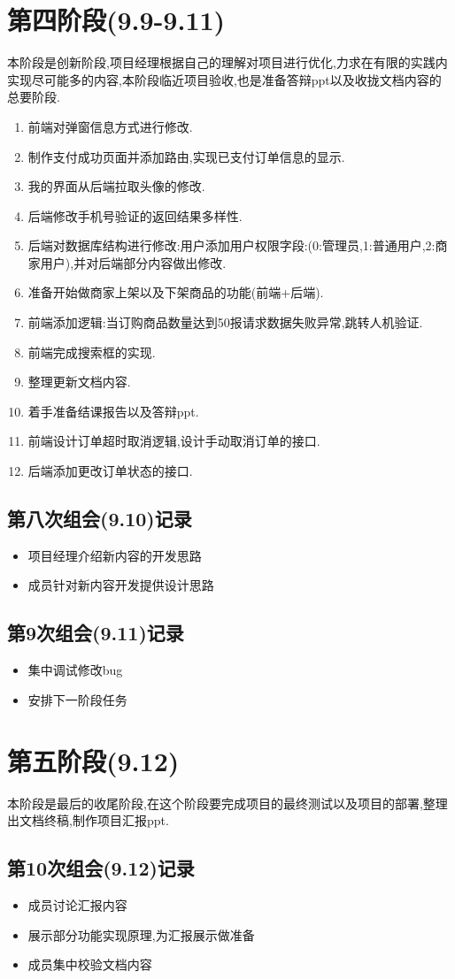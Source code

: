 \section{第四阶段(9.9-9.11)}
本阶段是创新阶段,项目经理根据自己的理解对项目进行优化,力求在有限的实践内实现尽可能多的内容,本阶段临近项目验收,也是准备答辩ppt以及收拢文档内容的总要阶段.
 \begin{enumerate}
     \item 前端对弹窗信息方式进行修改.
     \item 制作支付成功页面并添加路由,实现已支付订单信息的显示.
     \item 我的界面从后端拉取头像的修改.
     \item 后端修改手机号验证的返回结果多样性.
     \item 后端对数据库结构进行修改:用户添加用户权限字段:(0:管理员,1:普通用户,2:商家用户),并对后端部分内容做出修改.
     \item 准备开始做商家上架以及下架商品的功能(前端+后端).
     \item 前端添加逻辑:当订购商品数量达到50报请求数据失败异常,跳转人机验证.
     \item 前端完成搜索框的实现.
     \item 整理更新文档内容.
     \item 着手准备结课报告以及答辩ppt.
     \item 前端设计订单超时取消逻辑,设计手动取消订单的接口.
     \item 后端添加更改订单状态的接口.
 \end{enumerate}

 \subsection{第八次组会(9.10)记录}
\begin{itemize}
    \item 项目经理介绍新内容的开发思路
    \item 成员针对新内容开发提供设计思路
\end{itemize}
 \subsection{第9次组会(9.11)记录}
\begin{itemize}
    \item 集中调试修改bug
    \item 安排下一阶段任务
\end{itemize}
\section{第五阶段(9.12)}
本阶段是最后的收尾阶段,在这个阶段要完成项目的最终测试以及项目的部署,整理出文档终稿,制作项目汇报ppt.
 \subsection{第10次组会(9.12)记录}
\begin{itemize}
    \item 成员讨论汇报内容
    \item 展示部分功能实现原理,为汇报展示做准备
    \item 成员集中校验文档内容
\end{itemize}